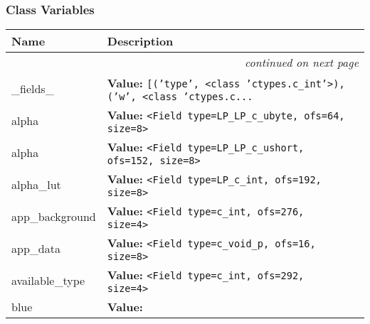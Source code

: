 
  \subsubsection{Class Variables}

    \vspace{-1cm}
\hspace{\varindent}\begin{longtable}{|p{\varnamewidth}|p{\vardescrwidth}|l}
\cline{1-2}
\cline{1-2} \centering \textbf{Name} & \centering \textbf{Description}& \\
\cline{1-2}
\endhead\cline{1-2}\multicolumn{3}{r}{\small\textit{continued on next page}}\\\endfoot\cline{1-2}
\endlastfoot\raggedright \_\-f\-i\-e\-l\-d\-s\-\_\- & \raggedright \textbf{Value:} 
{\tt \texttt{[}\texttt{(}\texttt{'}\texttt{type}\texttt{'}\texttt{, }{\textless}class 'ctypes.c\_int'{\textgreater}\texttt{)}\texttt{, }\texttt{(}\texttt{'}\texttt{w}\texttt{'}\texttt{, }{\textless}class 'ctypes.c\texttt{...}}&\\
\cline{1-2}
\raggedright a\-l\-p\-h\-a\- & \raggedright \textbf{Value:} 
{\tt {\textless}Field type=LP\_LP\_c\_ubyte, ofs=64, size=8{\textgreater}}&\\
\cline{1-2}
\raggedright a\-l\-p\-h\-a\-1\-6\- & \raggedright \textbf{Value:} 
{\tt {\textless}Field type=LP\_LP\_c\_ushort, ofs=152, size=8{\textgreater}}&\\
\cline{1-2}
\raggedright a\-l\-p\-h\-a\-\_\-l\-u\-t\- & \raggedright \textbf{Value:} 
{\tt {\textless}Field type=LP\_c\_int, ofs=192, size=8{\textgreater}}&\\
\cline{1-2}
\raggedright a\-p\-p\-\_\-b\-a\-c\-k\-g\-r\-o\-u\-n\-d\- & \raggedright \textbf{Value:} 
{\tt {\textless}Field type=c\_int, ofs=276, size=4{\textgreater}}&\\
\cline{1-2}
\raggedright a\-p\-p\-\_\-d\-a\-t\-a\- & \raggedright \textbf{Value:} 
{\tt {\textless}Field type=c\_void\_p, ofs=16, size=8{\textgreater}}&\\
\cline{1-2}
\raggedright a\-v\-a\-i\-l\-a\-b\-l\-e\-\_\-t\-y\-p\-e\- & \raggedright \textbf{Value:} 
{\tt {\textless}Field type=c\_int, ofs=292, size=4{\textgreater}}&\\
\cline{1-2}
\raggedright b\-l\-u\-e\- & \raggedright \textbf{Value:} 

\end{longtable}

